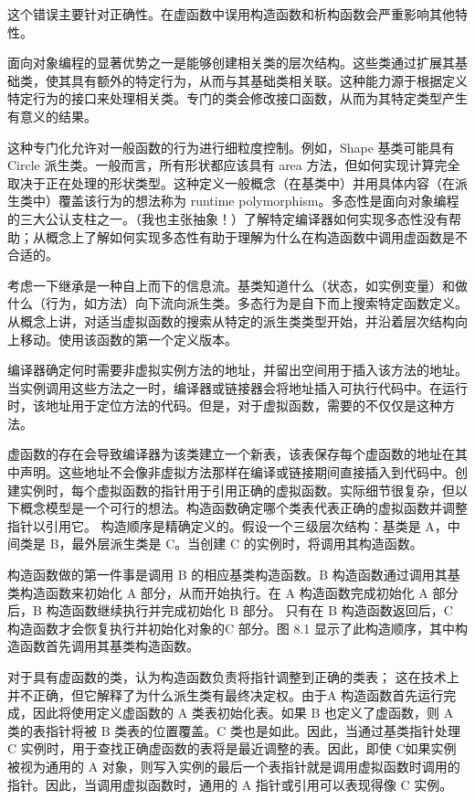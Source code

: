 这个错误主要针对正确性。在虚函数中误用构造函数和析构函数会严重影响其他特性。

面向对象编程的显著优势之一是能够创建相关类的层次结构。这些类通过扩展其基础类，使其具有额外的特定行为，从而与其基础类相关联。这种能力源于根据定义特定行为的接口来处理相关类。专门的类会修改接口函数，从而为其特定类型产生有意义的结果。

这种专门化允许对一般函数的行为进行细粒度控制。例如，Shape 基类可能具有 Circle 派生类。一般而言，所有形状都应该具有 area 方法，但如何实现计算完全取决于正在处理的形状类型。这种定义一般概念（在基类中）并用具体内容（在派生类中）覆盖该行为的想法称为 runtime polymorphism。多态性是面向对象编程的三大公认支柱之一。（我也主张抽象！）了解特定编译器如何实现多态性没有帮助；从概念上了解如何实现多态性有助于理解为什么在构造函数中调用虚函数是不合适的。

考虑一下继承是一种自上而下的信息流。基类知道什么（状态，如实例变量）和做什么（行为，如方法）向下流向派生类。多态行为是自下而上搜索特定函数定义。从概念上讲，对适当虚拟函数的搜索从特定的派生类类型开始，并沿着层次结构向上移动。使用该函数的第一个定义版本。

编译器确定何时需要非虚拟实例方法的地址，并留出空间用于插入该方法的地址。当实例调用这些方法之一时，编译器或链接器会将地址插入可执行代码中。在运行时，该地址用于定位方法的代码。但是，对于虚拟函数，需要的不仅仅是这种方法。

虚函数的存在会导致编译器为该类建立一个新表，该表保存每个虚函数的地址在其中声明。这些地址不会像非虚拟方法那样在编译或链接期间直接插入到代码中。创建实例时，每个虚拟函数的指针用于引用正确的虚拟函数。实际细节很复杂，但以下概念模型是一个可行的想法。构造函数确定哪个类表代表正确的虚拟函数并调整指针以引用它。
构造顺序是精确定义的。假设一个三级层次结构：基类是 A，中间类是 B，最外层派生类是 C。当创建 C 的实例时，将调用其构造函数。

构造函数做的第一件事是调用 B 的相应基类构造函数。B 构造函数通过调用其基类构造函数来初始化 A 部分，从而开始执行。在 A 构造函数完成初始化 A 部分后，B 构造函数继续执行并完成初始化 B 部分。
只有在 B 构造函数返回后，C 构造函数才会恢复执行并初始化对象的C 部分。图 8.1 显示了此构造顺序，其中构造函数首先调用其基类构造函数。

对于具有虚函数的类，认为构造函数负责将指针调整到正确的类表； 这在技术上并不正确，但它解释了为什么派生类有最终决定权。由于A 构造函数首先运行完成，因此将使用定义虚函数的 A 类表初始化表。如果 B 也定义了虚函数，则 A 类的表指针将被 B 类表的位置覆盖。C 类也是如此。因此，当通过基类指针处理 C 实例时，用于查找正确虚函数的表将是最近调整的表。因此，即使 C如果实例被视为通用的 A 对象，则写入实例的最后一个表指针就是调用虚拟函数时调用的指针。因此，当调用虚拟函数时，通用的 A 指针或引用可以表现得像 C 实例。

